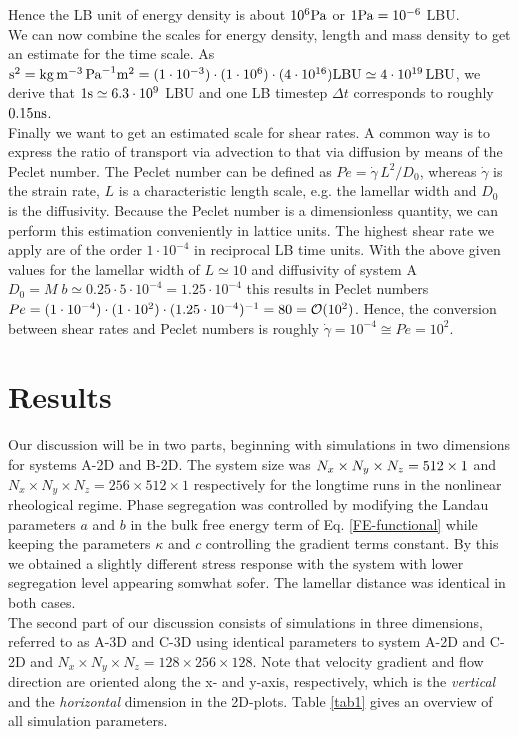 \documentclass[8.5pt,twoside,twocolumn]{article}
\newcommand{\e}[1]{\cdot10^{#1}}
\newcommand{\gd}{\dot{\gamma}}
\begin{document}
Hence the LB unit of energy density is about $10^{6} \rm{Pa}$ or $1\rm{Pa}=10^{-6}$ LBU.\\
We can now combine the scales for energy density, length and mass density to get an estimate for the time scale.
As ${\rm s}^2=\rm{kg}\, \rm{m}^{-3}\, \rm{Pa}^{-1}\rm{m}^2=(1\e{-3}) \cdot (1\e{6}) \cdot (4\e{16})\rm{LBU}\simeq4\e{19} \,{\rm LBU}$, we derive that $1 \rm{s}\simeq6.3\e{9}$ LBU and one LB timestep $\Delta t$ corresponds to roughly $0.15 \rm{ns}$.\\
Finally we want to get an estimated scale for shear rates. 
A common way is to express the ratio of transport via advection to that via diffusion by means of the Peclet number.
The Peclet number can be defined as $Pe=\gd\, L^2/D_0$, whereas $\gd$ is the strain rate, $L$ is a characteristic length scale, e.g. the lamellar width and $D_0$ is the diffusivity.
Because the Peclet number is a dimensionless quantity, we can perform this estimation conveniently in lattice units.
The highest shear rate we apply are of the order $1\e{-4}$ in reciprocal LB time units.
With the above given values for the lamellar width of $L\simeq10$ and diffusivity of system A $D_0=M\;b\simeq 0.25 \cdot 5\e{-4}=1.25\e{-4}$ this results in Peclet numbers $Pe=(1\e{-4})\cdot(1\e{2})\cdot(1.25\e{-4})^{-1}=80={\cal O}(10^2)$.
Hence, the conversion between shear rates and Peclet numbers is roughly $\gd=10^{-4}\cong Pe=10^2$.


\section{Results}

Our discussion will be in two parts, beginning with simulations in two dimensions for systems A-2D and B-2D.
The system size was $N_x\times N_y\times N_z=512\time1024\times 1$ and $N_x \times N_y \times N_z=256\times512\times 1$ respectively for the longtime runs in the nonlinear rheological regime.
Phase segregation was controlled by modifying the Landau parameters $a$ and $b$ in the bulk free energy term of Eq. \ref{FE-functional} while keeping the parameters $\kappa$ and $c$ controlling the gradient terms constant.
By this we obtained a slightly different stress response with the system with lower segregation level appearing somwhat sofer.
The lamellar distance was identical in both cases.\\
The second part of our discussion consists of simulations in three dimensions, referred to as A-3D and C-3D using identical parameters to system A-2D and C-2D and $N_x\times N_y\times N_z=128\times256\times128$.
Note that velocity gradient and flow direction are oriented along the x- and y-axis, respectively, which is the {\it vertical} and the {\it horizontal} dimension in the 2D-plots. 
Table \ref{tab1} gives an overview of all simulation parameters.
\end{document}
